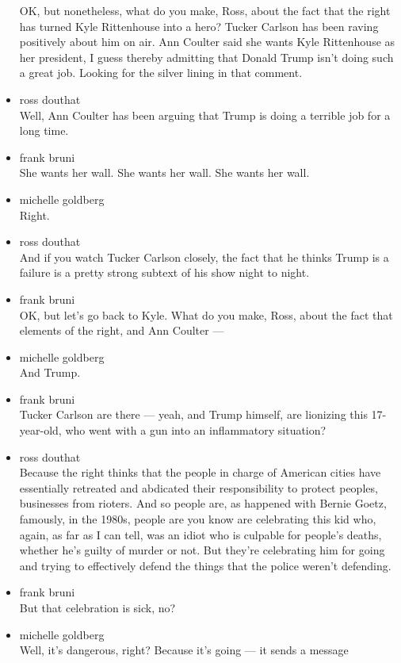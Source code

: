 \begin{itemize}
  OK, but nonetheless, what do you make, Ross, about the fact that the
  right has turned Kyle Rittenhouse into a hero? Tucker Carlson has been
  raving positively about him on air. Ann Coulter said she wants Kyle
  Rittenhouse as her president, I guess thereby admitting that Donald
  Trump isn't doing such a great job. Looking for the silver lining in
  that comment.
\item
  ross douthat\\
  Well, Ann Coulter has been arguing that Trump is doing a terrible job
  for a long time.
\item
  frank bruni\\
  She wants her wall. She wants her wall. She wants her wall.
\item
  michelle goldberg\\
  Right.
\item
  ross douthat\\
  And if you watch Tucker Carlson closely, the fact that he thinks Trump
  is a failure is a pretty strong subtext of his show night to night.
\item
  frank bruni\\
  OK, but let's go back to Kyle. What do you make, Ross, about the fact
  that elements of the right, and Ann Coulter ---
\item
  michelle goldberg\\
  And Trump.
\item
  frank bruni\\
  Tucker Carlson are there --- yeah, and Trump himself, are lionizing
  this 17-year-old, who went with a gun into an inflammatory situation?
\item
  ross douthat\\
  Because the right thinks that the people in charge of American cities
  have essentially retreated and abdicated their responsibility to
  protect peoples, businesses from rioters. And so people are, as
  happened with Bernie Goetz, famously, in the 1980s, people are you
  know are celebrating this kid who, again, as far as I can tell, was an
  idiot who is culpable for people's deaths, whether he's guilty of
  murder or not. But they're celebrating him for going and trying to
  effectively defend the things that the police weren't defending.
\item
  frank bruni\\
  But that celebration is sick, no?
\item
  michelle goldberg\\
  Well, it's dangerous, right? Because it's going --- it sends a message

\end{itemize}
